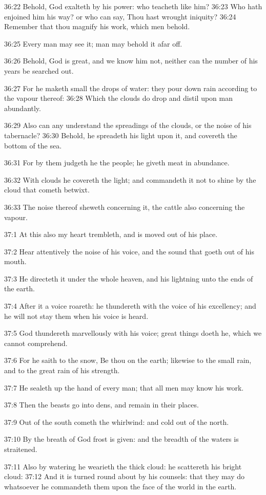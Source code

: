 36:22 Behold, God exalteth by his power: who teacheth like him?  36:23
Who hath enjoined him his way? or who can say, Thou hast wrought
iniquity?  36:24 Remember that thou magnify his work, which men
behold.

36:25 Every man may see it; man may behold it afar off.

36:26 Behold, God is great, and we know him not, neither can the
number of his years be searched out.

36:27 For he maketh small the drops of water: they pour down rain
according to the vapour thereof: 36:28 Which the clouds do drop and
distil upon man abundantly.

36:29 Also can any understand the spreadings of the clouds, or the
noise of his tabernacle?  36:30 Behold, he spreadeth his light upon
it, and covereth the bottom of the sea.

36:31 For by them judgeth he the people; he giveth meat in abundance.

36:32 With clouds he covereth the light; and commandeth it not to
shine by the cloud that cometh betwixt.

36:33 The noise thereof sheweth concerning it, the cattle also
concerning the vapour.

37:1 At this also my heart trembleth, and is moved out of his place.

37:2 Hear attentively the noise of his voice, and the sound that goeth
out of his mouth.

37:3 He directeth it under the whole heaven, and his lightning unto
the ends of the earth.

37:4 After it a voice roareth: he thundereth with the voice of his
excellency; and he will not stay them when his voice is heard.

37:5 God thundereth marvellously with his voice; great things doeth
he, which we cannot comprehend.

37:6 For he saith to the snow, Be thou on the earth; likewise to the
small rain, and to the great rain of his strength.

37:7 He sealeth up the hand of every man; that all men may know his
work.

37:8 Then the beasts go into dens, and remain in their places.

37:9 Out of the south cometh the whirlwind: and cold out of the north.

37:10 By the breath of God frost is given: and the breadth of the
waters is straitened.

37:11 Also by watering he wearieth the thick cloud: he scattereth his
bright cloud: 37:12 And it is turned round about by his counsels: that
they may do whatsoever he commandeth them upon the face of the world
in the earth.

